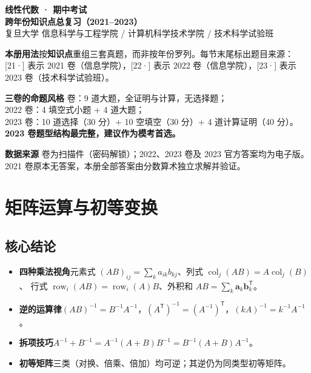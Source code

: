 \documentclass[10pt]{ctexart}
\newcommand{\TT}{^{\mathsf T}}
\newcommand{\y}[1]{\textcolor{y21}{[21·#1]}}
\newcommand{\yii}[1]{\textcolor{y22}{[22·#1]}}
\newcommand{\yiii}[1]{\textcolor{y23}{[23·#1]}}
\begin{document}
\begin{center}
{\LARGE\bfseries 线性代数 · 期中考试}\\[3pt]
{\Large\bfseries 跨年份知识点总复习（2021--2023）}\\[4pt]
{\small 复旦大学 \quad 信息科学与工程学院 / 计算机科学技术学院 / 技术科学试验班}
\end{center}

\vspace{0.1cm}
\begin{keybox}
\textbf{本册用法}\quad 按\textbf{知识点}重组三套真题，而非按年份罗列。每节末尾标出题目来源：
\y{} 表示 2021 卷（信息学院），\yii{} 表示 2022 卷（信息学院），\yiii{} 表示 2023 卷（技术科学试验班）。

\smallskip
\textbf{三卷的命题风格} 卷：9 道大题，全证明与计算，无选择题；\\
2022 卷：4 填空式小题 + 4 道大题；\\
2023 卷：10 道选择（30 分）+ 10 空填空（30 分）+ 4 道计算证明（40 分）。
\textbf{2023 卷题型结构最完整，建议作为模考首选。}

\smallskip
\textbf{数据来源} 卷为扫描件（密码解锁）；2022、2023 卷及 2023 官方答案均为电子版。
2021 卷原本无答案，本册全部答案由分数算术独立求解并验证。
\end{keybox}

\tableofcontents
\vspace{0.4cm}

\section{矩阵运算与初等变换}

\subsection{核心结论}

\begin{itemize}
\item \textbf{四种乘法视角}\quad 元素式 $(AB)_{ij}=\sum_k a_{ik}b_{kj}$、列式 $\operatorname{col}_j(AB)=A\operatorname{col}_j(B)$、
行式 $\operatorname{row}_i(AB)=\operatorname{row}_i(A)B$、外积和 $AB=\sum_k\mathbf a_k\mathbf b_k\TT$。
\item \textbf{逆的运算律}\quad $(AB)^{-1}=B^{-1}A^{-1}$，$(A\TT)^{-1}=(A^{-1})\TT$，$(kA)^{-1}=k^{-1}A^{-1}$。
\item \textbf{拆项技巧}\quad $A^{-1}+B^{-1}=A^{-1}(A+B)B^{-1}=B^{-1}(A+B)A^{-1}$。
\item \textbf{初等矩阵}\quad 三类（对换、倍乘、倍加）均可逆；其逆仍为同类型初等矩阵。
\end{itemize}
\end{document}
